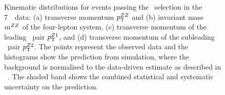 \begin{figure}[htbp]
\begin{center}
    \caption[Kinematic distributions for events passing the \ZZs\ selection in
    the 7~\tev\ data.]
    {Kinematic distributions for events passing the \ZZs\ selection in
    the 7~\tev\ data: (a) transverse momentum $p_{\mathrm{T}}^{ZZ}$ and (b) invariant mass $m^{ZZ}$ of the 
    four-lepton system, (c) transverse momentum of the leading
    \dilep\ pair $p_{\mathrm{T}}^{Z1}$, and (d) transverse momentum of the subleading
    \dilep\ pair $p_{\mathrm{T}}^{Z2}$. The points represent the observed data and the 
    histograms show the prediction from simulation, where the background
    is normalised to the data-driven estimate as described in
    ~. The shaded band 
    shows the combined statistical and systematic uncertainty on the prediction. 
    }
    \label{fig:zzdists-ZZs-seven}
\end{center}
\end{figure}


